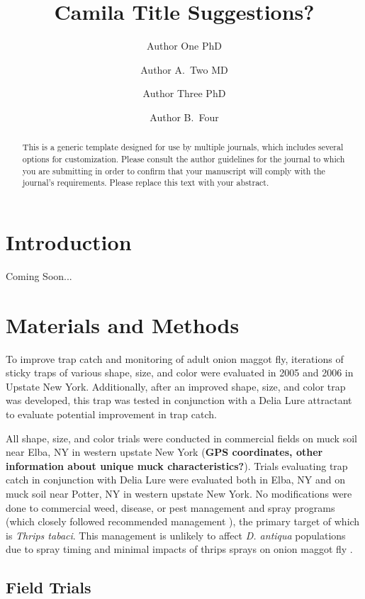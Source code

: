 \documentclass[alpha-refs]{wiley-article}
\title{Camila Title Suggestions?}
\author[1\authfn{1}]{Author One PhD}
\author[2\authfn{1}]{Author A.~Two MD}
\author[2\authfn{2}]{Author Three PhD}
\author[2]{Author B.~Four}
\affil[1]{Department, Institution, City, State or Province, Postal Code, Country}
\affil[2]{Department, Institution, City, State or Province, Postal Code, Country}
\begin{document}
\maketitle

\begin{abstract}
This is a generic template designed for use by multiple journals, which includes several options for customization. Please consult the author guidelines for the journal to which you are submitting in order to confirm that your manuscript will comply with the journal's requirements. Please replace this text with your abstract.

\end{abstract}

\section{Introduction}
Coming Soon...

\section{Materials and Methods}

To improve trap catch and monitoring of adult onion maggot fly, iterations of sticky traps of various shape, size, and color were evaluated in 2005 and 2006 in Upstate New York.  Additionally, after an improved shape, size, and color trap was developed, this trap was tested in conjunction with a Delia Lure attractant to evaluate potential improvement in trap catch.  

All shape, size, and color trials were conducted in commercial fields on muck soil near Elba, NY in western upstate New York (\textbf{GPS coordinates, other information about unique muck characteristics?}).  Trials evaluating trap catch in conjunction with Delia Lure were evaluated both in Elba, NY and on muck soil near Potter, NY in western upstate New York.  No modifications were done to commercial weed, disease, or pest management and spray programs (which closely followed recommended management \citep{reiners2011integrated}), the primary target of which is \textit{Thrips tabaci}.  This management is unlikely to affect \textit{D. antiqua} populations due to spray timing and minimal impacts of thrips sprays on onion maggot fly \citep{finch1986behavior}. 

\subsection{Field Trials}
\end{document}
